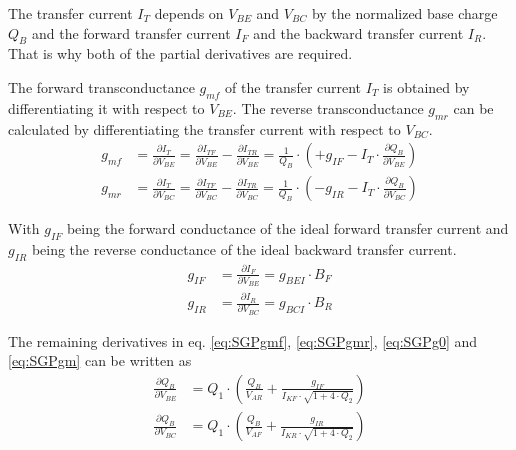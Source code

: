 The transfer current $I_T$ depends on $V_{BE}$ and $V_{BC}$ by the
normalized base charge $Q_B$ and the forward transfer current $I_{F}$
and the backward transfer current $I_R$.  That is why both of the
partial derivatives are required.

\addvspace{12pt}

The forward transconductance $g_{mf}$ of the transfer current $I_{T}$
is obtained by differentiating it with respect to $V_{BE}$.  The
reverse transconductance $g_{mr}$ can be calculated by differentiating
the transfer current with respect to $V_{BC}$.
\begin{align}
\label{eq:SGPgmf}
g_{mf} &= \frac{\partial I_{T}}{\partial V_{BE}} = \frac{\partial I_{TF}}{\partial V_{BE}} - \frac{\partial I_{TR}}{\partial V_{BE}} = \frac{1}{Q_B}\cdot\left(+g_{IF} - I_T\cdot \frac{\partial Q_B}{\partial V_{BE}}\right)\\
\label{eq:SGPgmr}
g_{mr} &= \frac{\partial I_{T}}{\partial V_{BC}} = \frac{\partial I_{TF}}{\partial V_{BC}} - \frac{\partial I_{TR}}{\partial V_{BC}} = \frac{1}{Q_B}\cdot\left(-g_{IR} - I_T\cdot \frac{\partial Q_B}{\partial V_{BC}}\right)
\end{align}

With $g_{IF}$ being the forward conductance of the ideal forward
transfer current and $g_{IR}$ being the reverse conductance of the
ideal backward transfer current.
\begin{align}
g_{IF} &= \frac{\partial I_F}{\partial V_{BE}} = g_{BEI}\cdot B_F\\
g_{IR} &= \frac{\partial I_R}{\partial V_{BC}} = g_{BCI}\cdot B_R
\end{align}

The remaining derivatives in eq. \eqref{eq:SGPgmf}, \eqref{eq:SGPgmr},
\eqref{eq:SGPg0} and \eqref{eq:SGPgm} can be written as
\begin{align}
\frac{\partial Q_B}{\partial V_{BE}} &= Q_1\cdot \left(\frac{Q_B}{V_{AR}} + \frac{g_{IF}}{I_{KF}\cdot \sqrt{1 + 4\cdot Q_2}}\right)\\
\frac{\partial Q_B}{\partial V_{BC}} &= Q_1\cdot \left(\frac{Q_B}{V_{AF}} + \frac{g_{IR}}{I_{KR}\cdot \sqrt{1 + 4\cdot Q_2}}\right)
\end{align}

